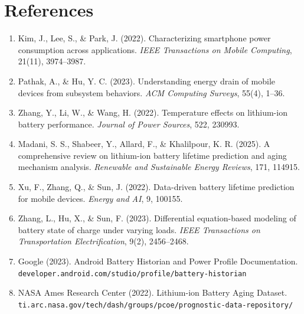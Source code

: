 \documentclass[11pt]{article}
\begin{document}
\section*{References}
\begin{enumerate}
  \item Kim, J., Lee, S., \& Park, J. (2022). Characterizing smartphone power consumption across applications. \emph{IEEE Transactions on Mobile Computing}, 21(11), 3974--3987.
  \item Pathak, A., \& Hu, Y. C. (2023). Understanding energy drain of mobile devices from subsystem behaviors. \emph{ACM Computing Surveys}, 55(4), 1--36.
  \item Zhang, Y., Li, W., \& Wang, H. (2022). Temperature effects on lithium-ion battery performance. \emph{Journal of Power Sources}, 522, 230993.
  \item Madani, S. S., Shabeer, Y., Allard, F., \& Khalilpour, K. R. (2025). A comprehensive review on lithium-ion battery lifetime prediction and aging mechanism analysis. \emph{Renewable and Sustainable Energy Reviews}, 171, 114915.
  \item Xu, F., Zhang, Q., \& Sun, J. (2022). Data-driven battery lifetime prediction for mobile devices. \emph{Energy and AI}, 9, 100155.
  \item Zhang, L., Hu, X., \& Sun, F. (2023). Differential equation-based modeling of battery state of charge under varying loads. \emph{IEEE Transactions on Transportation Electrification}, 9(2), 2456--2468.
  \item Google (2023). Android Battery Historian and Power Profile Documentation. \texttt{developer.android.com/studio/profile/battery-historian}
  \item NASA Ames Research Center (2022). Lithium-ion Battery Aging Dataset. \texttt{ti.arc.nasa.gov/tech/dash/groups/pcoe/prognostic-data-repository/}
\end{enumerate}
\end{document}
